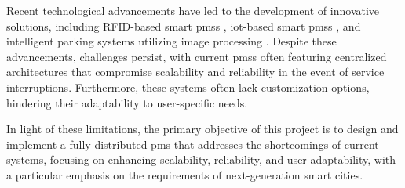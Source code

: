 Recent technological advancements have led to the development of innovative solutions, including RFID-based smart \glspl{pms} \autocite{rfid_smart_parking_management_system}, \gls{iot}-based smart \glspl{pms} \autocite{development_smart_parking_management_system}, and intelligent parking systems utilizing image processing \autocite{intelligent_parking_system_image_processing}. Despite these advancements, challenges persist, with current \glspl{pms} often featuring centralized architectures that compromise scalability and reliability in the event of service interruptions. Furthermore, these systems often lack customization options, hindering their adaptability to user-specific needs.

In light of these limitations, the primary objective of this project is to design and implement a fully distributed \gls{pms} that addresses the shortcomings of current systems, focusing on enhancing scalability, reliability, and user adaptability, with a particular emphasis on the requirements of next-generation smart cities.

